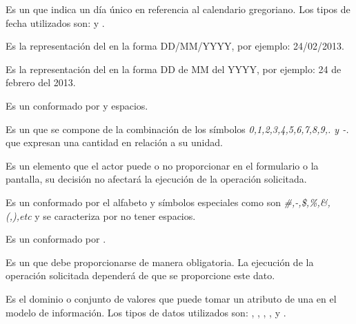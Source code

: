\begin{description}
	 Es un  que indica un día único en referencia al calendario gregoriano. Los tipos de fecha utilizados son:  y . %
	
	 Es la representación del   en la forma DD/MM/YYYY, por ejemplo: 24/02/2013.
	
	 Es la representación del   en la forma DD de MM del YYYY, por ejemplo: 24 de febrero del 2013.
	
	 Es un  conformado por  y espacios.
	
	 Es un  que se compone de la combinación de los símbolos \textit{0,1,2,3,4,5,6,7,8,9,. y -.}  que expresan una cantidad en relación a su unidad.
	
	 Es un elemento que el actor puede o no proporcionar en el formulario o la pantalla, su decisión no afectará la ejecución de la operación solicitada.
	
	 Es un   conformado por el alfabeto y símbolos especiales como son \textit{\#,-,\$,\%,\&,(,),etc} y se caracteriza por no tener espacios.
	
	 Es un  conformado por .
	
	 Es un  que debe proporcionarse de manera obligatoria. La ejecución de la operación solicitada dependerá de que se proporcione este dato.
	
	
	 Es el dominio o conjunto de valores que puede tomar un atributo de una  en el modelo de información. Los tipos de datos utilizados son: , , , ,  y .
	
\end{description}

